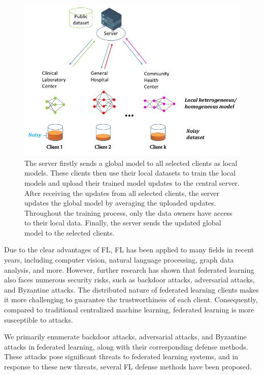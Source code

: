 \documentclass[conference]{IEEEtran}
\begin{document}
\begin{figure}[htbp]
    \centerline{\includegraphics[width=0.8\linewidth,height=0.6\linewidth]{picture/f1.png}}
    \caption{The server firstly sends a global model to all selected clients as local models. 
    These clients then use their local datasets to train the 
    local models and upload their trained model updates to the central server.
    After receiving the updates from all selected clients, 
    the server updates the global model by averaging the uploaded updates. 
    Throughout the training process, only the data owners 
    have access to their local data. Finally, the server sends the updated global model to the selected clients.}
    \label{fig1}
\end{figure}


Due to the clear advantages of FL, 
FL has been applied to many fields in recent years, 
including computer vision\cite{b5,b6}, natural language processing\cite{b7,b8}, 
graph data analysis\cite{b9,b10}, and more.
However, further research has shown that federated learning 
also faces numerous security risks, 
such as backdoor attacks, adversarial attacks, and Byzantine attacks. 
The distributed nature of federated learning clients 
makes it more challenging to guarantee 
the trustworthiness of each client. 
Consequently, compared to traditional centralized machine learning, 
federated learning is more susceptible to attacks.

We primarily enumerate backdoor attacks, adversarial attacks, 
and Byzantine attacks in federated learning, 
along with their corresponding defense methods. 
These attacks pose significant threats to federated learning systems, 
and in response to these new threats, several FL defense methods have been proposed.
\end{document}
